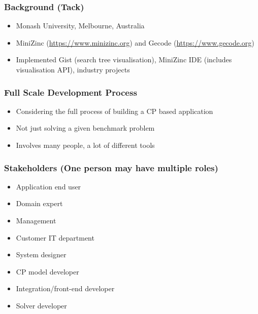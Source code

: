 \documentclass[dvipsnames,aspectratio=169]{beamer}
\begin{document}
\begin{frame}
\frametitle{Background (Tack)}
\begin{itemize}
    \item Monash University, Melbourne, Australia
    \item MiniZinc (\url{https://www.minizinc.org}) and Gecode (\url{https://www.gecode.org})
    \item Implemented Gist (search tree visualisation), MiniZinc IDE (includes visualisation API), industry projects
\end{itemize}
\end{frame}

\begin{frame}
\frametitle{Full Scale Development Process}
\begin{itemize}
\item Considering the full process of building a CP based application
\item Not just solving a given benchmark problem
\item Involves many people, a lot of different tools
\end{itemize}
\end{frame}

\begin{frame}
\frametitle{Stakeholders (One person may have multiple roles)}
\begin{itemize}
\item Application end user
\item Domain expert
\item Management
\item Customer IT department
\item System designer
\item CP model developer
\item Integration/front-end developer
\item Solver developer
\end{itemize}
\end{frame}
\end{document}
